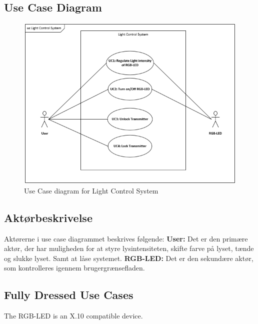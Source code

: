\documentclass[oneside]{memoir}
\begin{document}
    \subsection{Use Case Diagram}
\begin{figure}[H]
\centering
\includegraphics[width=0.9\linewidth]{"Kravspecifikation/ucdiagram"}
\caption{Use Case diagram for Light Control System}
\label{fig:ucdiagram}
\end{figure}

        \subsection{Aktørbeskrivelse}
Aktørerne i use case diagrammet beskrives følgende: 
\newline
 \textbf{User:} Det er den primære aktør, der har muligheden for at styre lysintensiteten, skifte farve på lyset, tænde og slukke lyset. Samt at låse systemet.
\textbf{RGB-LED:} Det er den sekundære aktør, som kontrolleres igennem brugergrænsefladen.
        \subsection{Fully Dressed Use Cases}
The RGB-LED is an X.10 compatible device.
\end{document}
